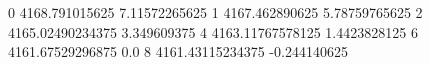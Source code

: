 0 4168.791015625 7.11572265625
1 4167.462890625 5.78759765625
2 4165.02490234375 3.349609375
4 4163.11767578125 1.4423828125
6 4161.67529296875 0.0
8 4161.43115234375 -0.244140625
